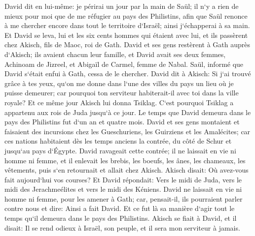 \verse David dit en lui-même: je périrai un jour par la main de Saül; il n`y a rien de mieux pour moi que de me réfugier au pays des Philistins, afin que Saül renonce à me chercher encore dans tout le territoire d`Israël; ainsi j`échapperai à sa main. 
\verse Et David se leva, lui et les six cents hommes qui étaient avec lui, et ils passèrent chez Akisch, fils de Maoc, roi de Gath. 
\verse David et ses gens restèrent à Gath auprès d`Akisch; ils avaient chacun leur famille, et David avait ses deux femmes, Achinoam de Jizreel, et Abigaïl de Carmel, femme de Nabal. 
\verse Saül, informé que David s`était enfui à Gath, cessa de le chercher. 
\verse David dit à Akisch: Si j`ai trouvé grâce à tes yeux, qu`on me donne dans l`une des villes du pays un lieu où je puisse demeurer; car pourquoi ton serviteur habiterait-il avec toi dans la ville royale? 
\verse Et ce même jour Akisch lui donna Tsiklag. C`est pourquoi Tsiklag a appartenu aux rois de Juda jusqu`à ce jour. 
\verse Le temps que David demeura dans le pays des Philistins fut d`un an et quatre mois. 
\verse David et ses gens montaient et faisaient des incursions chez les Gueschuriens, les Guirziens et les Amalécites; car ces nations habitaient dès les temps anciens la contrée, du côté de Schur et jusqu`au pays d`Égypte. 
\verse David ravageait cette contrée; il ne laissait en vie ni homme ni femme, et il enlevait les brebis, les boeufs, les ânes, les chameaux, les vêtements, puis s`en retournait et allait chez Akisch. 
\verse Akisch disait: Où avez-vous fait aujourd`hui vos courses? Et David répondait: Vers le midi de Juda, vers le midi des Jerachmeélites et vers le midi des Kéniens. 
\verse David ne laissait en vie ni homme ni femme, pour les amener à Gath; car, pensait-il, ils pourraient parler contre nous et dire: Ainsi a fait David. Et ce fut là sa manière d`agir tout le temps qu`il demeura dans le pays des Philistins. 
\verse Akisch se fiait à David, et il disait: Il se rend odieux à Israël, son peuple, et il sera mon serviteur à jamais. 

\chapter{}

